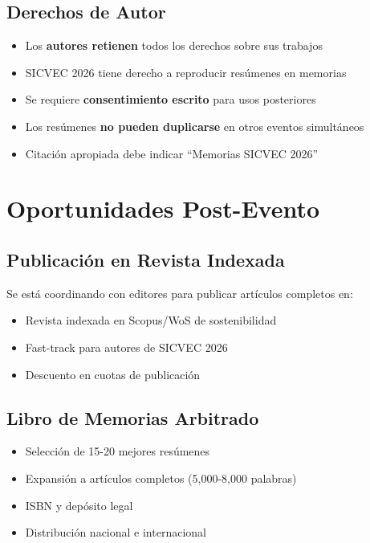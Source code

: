 \documentclass[12pt,a4paper]{article}
\begin{document}
\subsection{Derechos de Autor}

\begin{tcolorbox}[cajainfo, title=Propiedad Intelectual]
\begin{itemize}
  \item Los \textbf{autores retienen} todos los derechos sobre sus trabajos
  \item SICVEC 2026 tiene derecho a reproducir resúmenes en memorias
  \item Se requiere \textbf{consentimiento escrito} para usos posteriores
  \item Los resúmenes \textbf{no pueden duplicarse} en otros eventos simultáneos
  \item Citación apropiada debe indicar ``Memorias SICVEC 2026''
\end{itemize}
\end{tcolorbox}

\section{Oportunidades Post-Evento}

\subsection{Publicación en Revista Indexada}

Se está coordinando con editores para publicar artículos completos en:

\begin{itemize}[label={\textcolor{verdemid}{\checkmark}}]
  \item Revista indexada en Scopus/WoS de sostenibilidad
  \item Fast-track para autores de SICVEC 2026
  \item Descuento en cuotas de publicación
\end{itemize}

\subsection{Libro de Memorias Arbitrado}

\begin{itemize}[label={\textcolor{verdemid}{\checkmark}}]
  \item Selección de 15-20 mejores resúmenes
  \item Expansión a artículos completos (5,000-8,000 palabras)
  \item ISBN y depósito legal
  \item Distribución nacional e internacional
\end{itemize}
\end{document}
